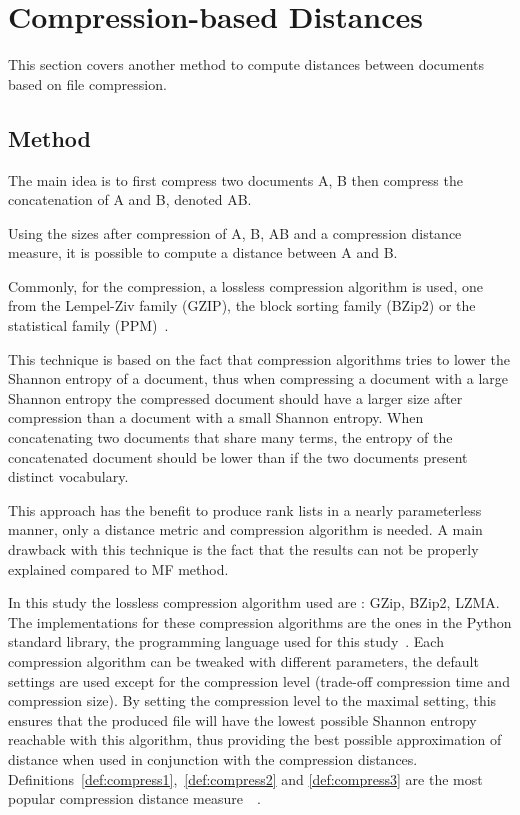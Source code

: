 \section{Compression-based Distances \label{sec:compression_based_distances}}

This section covers another method to compute distances between documents based on file compression.

\subsection{Method}

The main idea is to first compress two documents A, B then compress the concatenation of A and B, denoted AB.

Using the sizes after compression of A, B, AB and a compression distance measure, it is possible to compute a distance between A and B.

Commonly, for the compression, a lossless compression algorithm is used, one from the Lempel-Ziv family (GZIP), the block sorting family (BZip2) or the statistical family (PPM)~\cite{comparing_compression}.

This technique is based on the fact that compression algorithms tries to lower the Shannon entropy of a document, thus when compressing a document with a large Shannon entropy the compressed document should have a larger size after compression than a document with a small Shannon entropy.
When concatenating two documents that share many terms, the entropy of the concatenated document should be lower than if the two documents present distinct vocabulary.

This approach has the benefit to produce rank lists in a nearly parameterless manner, only a distance metric and compression algorithm is needed.
A main drawback with this technique is the fact that the results can not be properly explained compared to MF method.

In this study the lossless compression algorithm used are : GZip, BZip2, LZMA.
The implementations for these compression algorithms are the ones in the Python standard library, the programming language used for this study~\cite{python_standard_library}.
Each compression algorithm can be tweaked with different parameters, the default settings are used except for the compression level (trade-off compression time and compression size).
By setting the compression level to the maximal setting, this ensures that the produced file will have the lowest possible Shannon entropy reachable with this algorithm, thus providing the best possible approximation of distance when used in conjunction with the compression distances.
Definitions~\ref{def:compress1},~\ref{def:compress2} and \ref{def:compress3} are the most popular compression distance measure~\cite{comparing_compression}~\cite{savoy_stylo}.

